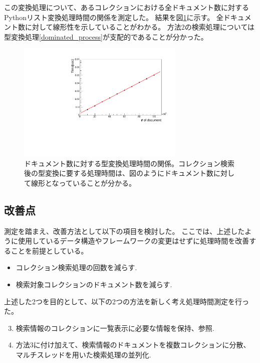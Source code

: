 この変換処理について、あるコレクションにおける全ドキュメント数に対するPythonリスト変換処理時間の関係を測定した。
結果を図\ref{dominated_process_relation}に示す。
全ドキュメント数に対して線形性を示していることがわかる。
方法2の検索処理については型変換処理\ref{dominated_process}が支配的であることが分かった。
\begin{figure}[bpt]
  \begin{center}
    \includegraphics[width=8cm,angle=270]{./dominated_process_relation.pdf}
  \caption[ドキュメント数に対する型変換処理時間の関係]{ドキュメント数に対する型変換処理時間の関係。コレクション検索後の型変換に要する処理時間は、図のようにドキュメント数に対して線形となっていることが分かる。}
  \label{dominated_process_relation}
  \end{center}
\end{figure}

\subsection{改善点}

測定を踏まえ、改善方法として以下の項目を検討した。
ここでは、上述したように使用しているデータ構造やフレームワークの変更はせずに処理時間を改善することを前提としている。
\begin{itemize}
  \item コレクション検索処理の回数を減らす.
  \item 検索対象コレクションのドキュメント数を減らす.
\end{itemize}

上述した2つを目的として、以下の2つの方法を新しく考え処理時間測定を行った。

\begin{enumerate}
  \setcounter{enumi}{2}
  \item 検索情報のコレクションに一覧表示に必要な情報を保持、参照.
  \item 方法3に付け加えて、検索情報のドキュメントを複数コレクションに分散、マルチスレッドを用いた検索処理の並列化.
\end{enumerate}

